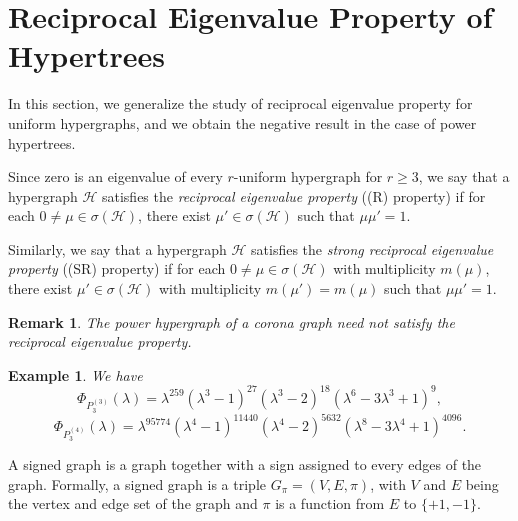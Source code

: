 \documentclass[10pt,a4paper]{article}
\newtheorem{remark}{Remark}[section]
\newtheorem{example}{Example}[section]
\begin{document}
	
	
	
	
	
	
	
	
	
	
	
	
	
	
	
	
	
	
	\section{Reciprocal Eigenvalue Property of Hypertrees}
	
	In this section, we generalize the study of reciprocal eigenvalue property for uniform hypergraphs, and we obtain the negative result in the case of power hypertrees.
	
	Since zero is an eigenvalue of every $r$-uniform hypergraph for $r \geq3$, we say that  a hypergraph $\mathcal{H}$ satisfies the \emph{reciprocal eigenvalue property} ((R) property) if for each $0 \neq \mu \in \sigma(\mathcal{H})$, there exist $\mu' \in \sigma(\mathcal{H})$ such that $\mu \mu' =1.$
	
	Similarly, we say that a hypergraph $\mathcal{H}$ satisfies the \emph{strong reciprocal eigenvalue property} ((SR) property) if for each $0 \neq \mu \in \sigma(\mathcal{H})$ with multiplicity $m(\mu)$, there exist $\mu' \in \sigma(\mathcal{H})$ with multiplicity $m(\mu')= m(\mu)$  such that $\mu \mu' = 1.$
	
	
	\begin{remark}
		The power hypergraph of a corona graph need not satisfy the reciprocal eigenvalue property.
	\end{remark}
	
	\begin{example}
		We have 
		\begin{equation*}
			\Phi_{P_3^{(3)}}(\lambda)= \lambda^{259}(\lambda^3-1)^{27}(\lambda^3-2)^{18}(\lambda^6-3\lambda^3+1)^9, 
		\end{equation*}
		\begin{equation*}
			\Phi_{P_3^{(4)}}(\lambda)= \lambda^{95774}(\lambda^4-1)^{11440}(\lambda^4-2)^{5632}(\lambda^8-3\lambda^4+1)^{4096}. 
		\end{equation*}
	\end{example}
	
	
	A signed graph is a graph together with a sign assigned to every edges of the graph. Formally, a signed graph is a triple $G_{\pi} = (V,E,\pi)$, with $V$ and $E$ being the vertex and edge set of the graph and $\pi$ is a function from $E$ to $\{ +1,-1 \}.$
	
\end{document}

